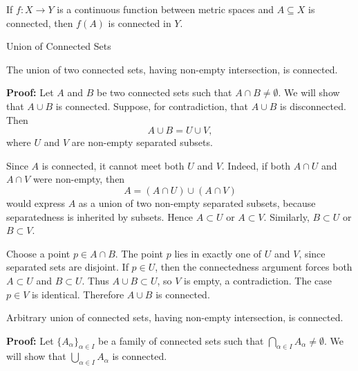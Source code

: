 \documentclass[12pt, a4paper]{article}
\begin{document}
\begin{theorem}
    If \(f: X \to Y\) is a continuous function between metric spaces and \(A \subseteq X\) is connected, then \(f(A)\) is connected in \(Y\).
\end{theorem}

\clearpage

\begin{heading}
    Union of Connected Sets
\end{heading}

\vspace{10pt}

\begin{theorem}
    The union of two connected sets, having non-empty intersection, is connected.
\end{theorem}

\vspace{10pt}

\textbf{Proof:}  Let \(A\) and \(B\) be two connected sets such that \(A\cap B\neq \emptyset\).  We will show that \(A\cup B\) is connected.
Suppose, for contradiction, that \(A\cup B\) is disconnected.  Then
\[
A\cup B=U\cup V,
\]
where \(U\) and \(V\) are non-empty separated subsets.

Since \(A\) is connected, it cannot meet both \(U\) and \(V\).  Indeed, if both \(A\cap U\) and \(A\cap V\) were non-empty, then
\[
A=(A\cap U)\cup(A\cap V)
\]
would express \(A\) as a union of two non-empty separated subsets, because separatedness is inherited by subsets.  Hence \(A\subset U\) or \(A\subset V\).  Similarly, \(B\subset U\) or \(B\subset V\).

Choose a point \(p\in A\cap B\).  The point \(p\) lies in exactly one of \(U\) and \(V\), since separated sets are disjoint.  If \(p\in U\), then the connectedness argument forces both \(A\subset U\) and \(B\subset U\).  Thus \(A\cup B\subset U\), so \(V\) is empty, a contradiction.  The case \(p\in V\) is identical.  Therefore \(A\cup B\) is connected.

\clearpage

\begin{theorem}
    Arbitrary union of connected sets, having non-empty intersection, is connected.
\end{theorem}

\vspace{10pt}

\textbf{Proof:}  Let \(\{A_\alpha\}_{\alpha\in I}\) be a family of connected sets such that \(\bigcap_{\alpha\in I} A_\alpha\neq \emptyset\).  We will show that \(\bigcup_{\alpha\in I} A_\alpha\) is connected.
\end{document}
